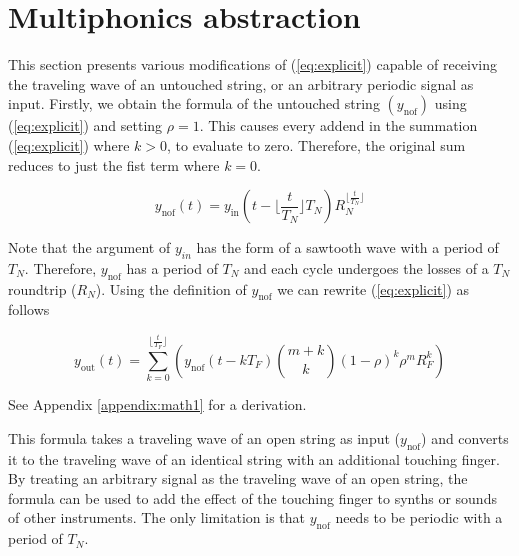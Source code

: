 \documentclass{sigchi}
\begin{document}
\section{Multiphonics abstraction}

This section presents various modifications of (\ref{eq:explicit}) capable of receiving the traveling wave of an untouched string, or an arbitrary periodic signal as input.
Firstly, we obtain the formula of the untouched string $(y_{\textrm{nof}})$ using (\ref{eq:explicit}) and setting $\rho=1$.
This causes every addend in the summation (\ref{eq:explicit}) where $k > 0$, to evaluate to zero.
Therefore, the original sum reduces to just the fist term where $k = 0$.

\begin{equation}\label{eq:rho0}
	y_{\textrm{nof}}(t) = y_{\textrm{in}}(t-\lfloor\frac{t}{T_N}\rfloor T_N)R_N^{\lfloor\frac{t}{T_N}\rfloor}
\end{equation}

Note that the argument of $y_{in}$ has the form of a sawtooth wave with a period of $T_N$.
Therefore, $y_{\textrm{nof}}$ has a period of $T_N$ and each cycle undergoes the losses of a $T_N$ roundtrip ($R_N$).
Using the definition of $y_{\textrm{nof}}$ we can rewrite (\ref{eq:explicit}) as follows

\begin{equation} \label{eq:y0rf}
	y_{\textrm{out}}(t) = \sum_{k=0}^{\lfloor \frac{t}{T_F} \rfloor}\left(y_{\textrm{nof}}(t - kT_F)\binom{m+k}{k} (1 - \rho)^{k} \rho^mR_F^k\right)
\end{equation}

See Appendix \ref{appendix:math1} for a derivation.

This formula takes a traveling wave of an open string as input ($y_{\textrm{nof}}$) and converts it to the traveling wave of an identical string with an additional touching finger.
By treating an arbitrary signal as the traveling wave of an open string, the formula can be used to add the effect of the touching finger to synths or sounds of other instruments.
The only limitation is that $y_{\textrm{nof}}$ needs to be periodic with a period of $T_N$.
\end{document}
